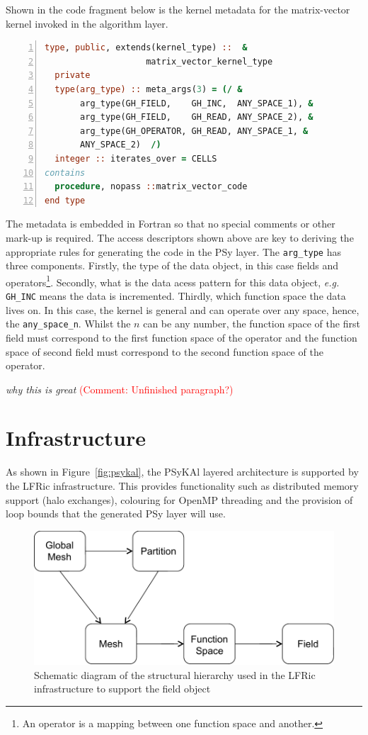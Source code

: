 \documentclass[times]{elsarticle}
\begin{document}
Shown in the code fragment below is the kernel metadata for the
matrix-vector kernel invoked in the algorithm layer.
\begin{lstlisting}[language=Fortran, numbers=left,caption={Code
fragment showing kernel metadata for the matrix-vector operator kernel},label={lst:metadata}]
type, public, extends(kernel_type) ::  &
                    matrix_vector_kernel_type
  private
  type(arg_type) :: meta_args(3) = (/ &
       arg_type(GH_FIELD,    GH_INC,  ANY_SPACE_1), &
       arg_type(GH_FIELD,    GH_READ, ANY_SPACE_2), &
       arg_type(GH_OPERATOR, GH_READ, ANY_SPACE_1, &
       ANY_SPACE_2)  /)
  integer :: iterates_over = CELLS
contains
  procedure, nopass ::matrix_vector_code
end type
\end{lstlisting}
The metadata is embedded in Fortran so that no special comments or
other mark-up is required. The access descriptors shown above are key
to deriving the appropriate rules for generating the code in the PSy
layer. The \verb+arg_type+ has three components. Firstly, the type of
the data object, in this case fields and operators\footnote{An
  operator is a mapping between one function space and another.}. Secondly, what is
the data acess pattern for this data object, {\em e.g.} \verb+GH_INC+ means the data is
incremented. Thirdly, which function space the data lives on. In this case, the
kernel is general and can operate over any space, hence, the
\verb+any_space_n+. Whilst the $n$ can be any number, the function space of the
first field must correspond to the first function space of the operator and the
function space of second field must correspond to the second function
space of the operator. 

{\em why this is great} \textcolor{red}{(Comment: Unfinished paragraph?)}


\section{\label{sec:lib}Infrastructure}

As shown in Figure~\ref{fig:psykal}, the PSyKAl layered
architecture is supported by the LFRic infrastructure. This provides
functionality such as distributed memory support (halo exchanges),
colouring for OpenMP threading and the provision of loop bounds that the
generated PSy layer will use.

\begin{figure}
\centering\includegraphics[width=0.8\linewidth]{infrastructure_objects.pdf}
\caption{\label{fig:objects} Schematic diagram of the structural
hierarchy used in the LFRic infrastructure to support the field object}
\end{figure}
\end{document}
